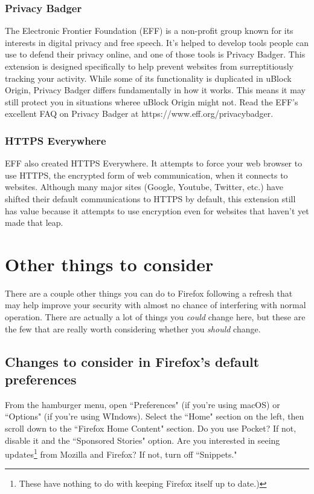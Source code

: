\documentclass[fontsize=11pt]{article}
\begin{document}
\subsubsection*{Privacy Badger}
The Electronic Frontier Foundation (EFF) is a non-profit group known for its interests in digital privacy and free speech.  It's helped to develop tools people can use to defend their privacy online, and one of those tools is Privacy Badger.  This extension is designed specifically to help prevent websites from surreptitiously tracking your activity.  While some of its functionality is duplicated in uBlock Origin, Privacy Badger differs fundamentally in how it works.  This means it may still protect you in situations wheree uBlock Origin might not.  Read the EFF's excellent FAQ on Privacy Badger at https://www.eff.org/privacybadger.


\subsubsection*{HTTPS Everywhere}
 EFF also created HTTPS Everywhere.  It attempts to force your web browser to use HTTPS, the encrypted form of web communication, when it connects to websites.  Although many major sites (Google, Youtube, Twitter, etc.) have shifted their default communications to HTTPS by default, this extension still has value because it attempts to use encryption even for websites that haven't yet made that leap.



\section{Other things to consider}
There are a couple other things you can do to Firefox following a refresh that may help improve your security with almost no chance of interfering with normal operation.  There are actually a lot of things you \emph{could} change here, but these are the few that are really worth considering whether you \emph{should} change.

\subsection*{Changes to consider in Firefox's default preferences}
From the hamburger menu, open ``Preferences" (if you're using macOS) or ``Options" (if you're using WIndows).  Select the ``Home" section on the left, then scroll down to the ``Firefox Home Content" section.  Do you use Pocket?  If not, disable it and the ``Sponsored Stories" option.  Are you interested in seeing updates\footnote{These have nothing to do with keeping Firefox itself up to date.)} from Mozilla and Firefox?  If not, turn off ``Snippets."
\end{document}
